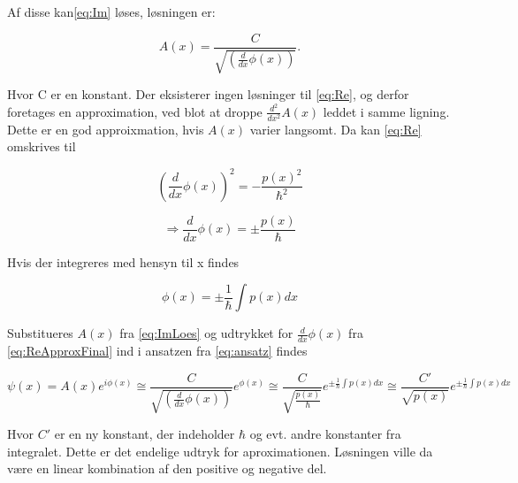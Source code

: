 Af disse kan\cref{eq:Im}  løses, løsningen er: %

\begin{equation}
    A(x) = \frac{C}{\sqrt{(\frac{d}{d x} \phi{\left (x \right )})}}.
    \label{eq:ImLoes}
\end{equation}

Hvor C er en konstant. Der eksisterer ingen løsninger til \cref{eq:Re}, og derfor foretages en approximation, ved blot at droppe $\frac{d^{2}}{d x^{2}}  A{\left (x \right )}$ leddet i samme ligning. Dette er en god approixmation, hvis $A(x)$ varier langsomt. Da kan \cref{eq:Re} omskrives til

\begin{equation}
    \left(\frac{d}{d x} \phi{\left (x \right )}\right)^{2}
    = - \frac{p(x)^2}{\hbar^2}
    \label{eq:ReApprox}
\end{equation}

\begin{equation}
    \Rightarrow \frac{d}{d x} \phi{\left (x \right )}
    = \pm \frac{p(x)}{\hbar}
    \label{eq:ReApproxFinal}
\end{equation}

Hvis der integreres med hensyn til x findes

\begin{equation}
    \phi(x) = \pm \frac{1}{\hbar} \int p(x) dx
    \label{wq:thisPhi}
\end{equation}

Substitueres $A(x)$ fra \cref{eq:ImLoes} og udtrykket for $\frac{d}{d x} \phi{\left (x \right )}$ fra \cref{eq:ReApproxFinal}  ind i ansatzen fra \cref{eq:ansatz} findes

\begin{equation}
    \psi(x) = A(x) e^{i \phi(x)} \cong
    \frac{C}{\sqrt{(\frac{d}{d x} \phi{\left (x \right )})}} e^{\phi(x)} \cong
    \frac{C}{\sqrt{\frac{p(x)}{\hbar}}} e^{\pm \frac{1}{\hbar} \int p(x) dx} \cong
    \frac{C'}{\sqrt{p(x)}} e^{\pm \frac{1}{\hbar} \int p(x) dx}
    \label{eq:final}
\end{equation}

Hvor $C'$ er en ny konstant, der indeholder $\hbar$ og evt. andre konstanter fra integralet. Dette er det endelige udtryk for aproximationen. Løsningen ville da være en linear kombination af den positive og negative del.
